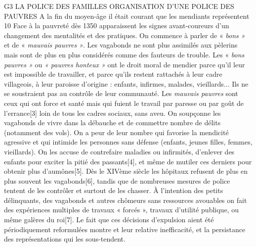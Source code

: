 G3 LA POLICE DES FAMILLES
ORGANISATION D'UNE POLICE DES PAUVRES
 A la fin du moyen-âge il était courant que les mendiants représentent 10 %
 Face à la pauvreté dès 1350 apparaissent les signes avant-coureurs d'un changement des mentalités et des pratiques. On commence à parler de « \emph{bons »} et de « \emph{mauvais pauvres »}. Les vagabonds ne sont plus assimilés aux pèlerins mais sont de plus en plus considérés comme des fauteurs de trouble. Les « \emph{bons pauvres »} ou \emph{« pauvres honteux »} ont le droit moral de mendier parce qu'il leur est impossible de travailler, et parce qu'ils restent rattachés à leur cadre villageois, à leur paroisse d'origine : enfants, infirmes, malades, vieillards... Ils ne se soustraient pas au contrôle de leur communauté. Les \emph{mauvais pauvres} sont ceux qui ont force et santé mais qui fuient le travail par paresse ou par goût de l'errance[3] loin de tous les cadres sociaux, sans aveu. On soupçonne les vagabonds de vivre dans la débauche et de commettre nombre de délits (notamment des vols). On a peur de leur nombre qui favorise la mendicité agressive et qui intimide les personnes sans défense (enfants, jeunes filles, femmes, vieillards). On les accuse de contrefaire maladies ou infirmités, d'enlever des enfants pour exciter la pitié des passants[4], et même de mutiler ces derniers pour obtenir plus d'aumônes[5]. 
 Dès le XIVème siècle les hôpitaux refusent de plus en plus souvent les vagabonds[6], tandis que de nombreuses mesures de police tentent de les contrôler et surtout de les chasser. À l'intention des petits délinquants, des vagabonds et autres chômeurs sans ressources avouables on fait des expériences multiples de travaux « forcés », travaux d'utilité publique, ou même galères du roi[7]. Le fait que ces décisions d'expulsion aient été périodiquement reformulées montre et leur relative inefficacité, et la persistance des représentations qui les sous-tendent.
